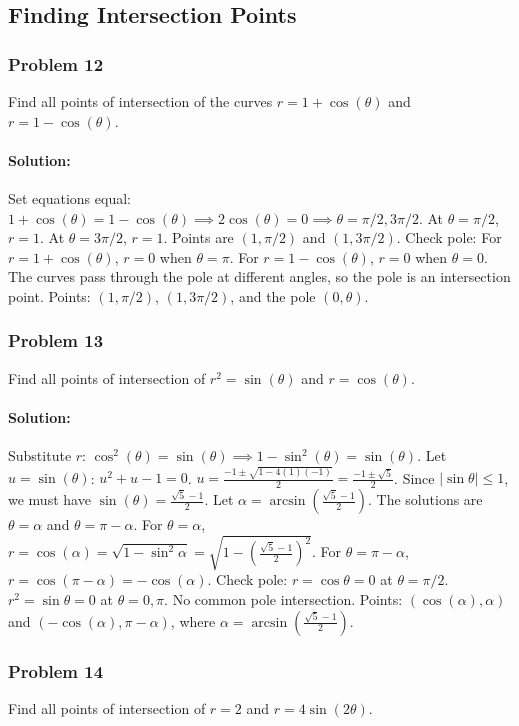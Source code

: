 \documentclass{article}
\begin{document}

\subsection*{Finding Intersection Points}

\subsubsection*{Problem 12}
Find all points of intersection of the curves $r = 1 + \cos(\theta)$ and $r = 1 - \cos(\theta)$.
\paragraph{Solution:}
Set equations equal: $1+\cos(\theta) = 1 - \cos(\theta) \implies 2\cos(\theta)=0 \implies \theta = \pi/2, 3\pi/2$.
At $\theta=\pi/2$, $r=1$. At $\theta=3\pi/2$, $r=1$. Points are $(1, \pi/2)$ and $(1, 3\pi/2)$.
Check pole: For $r=1+\cos(\theta)$, $r=0$ when $\theta=\pi$. For $r=1-\cos(\theta)$, $r=0$ when $\theta=0$. The curves pass through the pole at different angles, so the pole is an intersection point.
Points: $(1, \pi/2)$, $(1, 3\pi/2)$, and the pole $(0, \theta)$.

\subsubsection*{Problem 13}
Find all points of intersection of $r^2 = \sin(\theta)$ and $r = \cos(\theta)$.
\paragraph{Solution:}
Substitute $r$: $\cos^2(\theta) = \sin(\theta) \implies 1-\sin^2(\theta) = \sin(\theta)$.
Let $u=\sin(\theta)$: $u^2+u-1=0$. $u = \frac{-1 \pm \sqrt{1-4(1)(-1)}}{2} = \frac{-1 \pm \sqrt{5}}{2}$.
Since $|\sin\theta| \le 1$, we must have $\sin(\theta) = \frac{\sqrt{5}-1}{2}$.
Let $\alpha = \arcsin(\frac{\sqrt{5}-1}{2})$. The solutions are $\theta = \alpha$ and $\theta = \pi-\alpha$.
For $\theta=\alpha$, $r = \cos(\alpha) = \sqrt{1-\sin^2\alpha} = \sqrt{1 - (\frac{\sqrt{5}-1}{2})^2}$.
For $\theta=\pi-\alpha$, $r=\cos(\pi-\alpha) = -\cos(\alpha)$.
Check pole: $r=\cos\theta=0$ at $\theta=\pi/2$. $r^2=\sin\theta=0$ at $\theta=0, \pi$. No common pole intersection.
Points: $(\cos(\alpha), \alpha)$ and $(-\cos(\alpha), \pi-\alpha)$, where $\alpha=\arcsin(\frac{\sqrt{5}-1}{2})$.

\subsubsection*{Problem 14}
Find all points of intersection of $r = 2$ and $r = 4\sin(2\theta)$.
\end{document}
